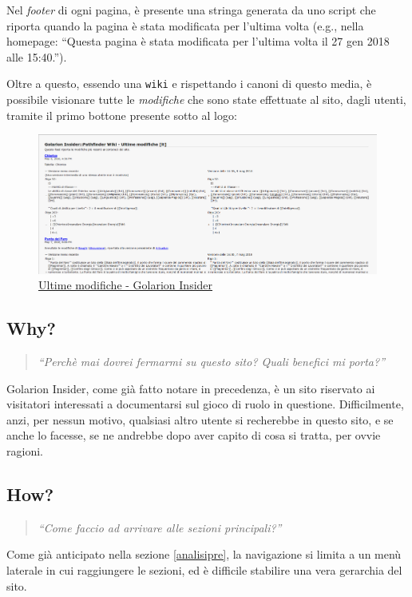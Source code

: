 Nel \emph{footer} di ogni pagina, è presente una stringa generata da uno script che riporta quando la pagina è stata 
modificata per l'ultima volta (e.g., nella homepage: ``Questa pagina è stata modificata per l'ultima volta il 27 gen 2018 alle 15:40.'').

Oltre a questo, essendo una \texttt{wiki} e rispettando i canoni di questo media, è possibile visionare tutte le
\emph{modifiche}
che sono state effettuate al sito, dagli utenti, tramite il primo bottone presente sotto al logo: 

\begin{figure}[hbt]
    \includegraphics[width=\textwidth]{img/ultime_modifiche.png}
    \caption{\href{http://golarion.altervista.org/api.php?hidebots=1&days=7&limit=50&hidecategorization=1&action=feedrecentchanges&feedformat=atom}{Ultime modifiche - Golarion Insider}}
\end{figure}

\subsection{Why?}
\begin{quote}
    \emph{``Perchè mai dovrei fermarmi su questo sito? Quali benefici mi porta?''}
\end{quote}

Golarion Insider, come già fatto notare in precedenza, è un sito riservato ai visitatori interessati a documentarsi sul
gioco di ruolo in questione. Difficilmente, anzi, per nessun motivo, qualsiasi altro utente si recherebbe in questo sito, e
se anche lo facesse, se ne andrebbe dopo aver capito di cosa si tratta, per ovvie ragioni.

\subsection{How?}
\begin{quote}
    \emph{``Come faccio ad arrivare alle sezioni principali?''}
\end{quote}
Come già anticipato nella sezione \ref{analisipre}, la navigazione si limita a un menù laterale in cui raggiungere le sezioni,
ed è difficile stabilire una vera gerarchia del sito.


